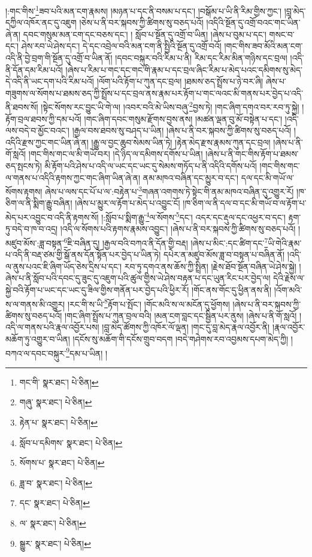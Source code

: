 །:གང་གིས་\footnote{གང་གི་  སྣར་ཐང་།  པེ་ཅིན། }ཟབ་པའི་མན་ངག་རྣམས། །མཉན་པ་དང་ནི་བསམ་པ་དང་། །བསྒོམ་པ་ཡི་ནི་རིམ་གྱིས་ཀྱང་། །བླ་མེད་དཀྱིལ་འཁོར་ནང་དུ་འཇུག །ཅེས་པ་ནི་བར་སྐབས་ཀྱི་ཚིགས་སུ་བཅད་པའོ། །འདིའི་སྔོན་དུ་འགྲོ་བའང་གང་ཡིན་ཞེ་ན། དབང་གསུམ་མན་ངག་དང་བཅས་དང་། །
སློབ་པ་སྔོན་དུ་འགྲོ་བ་ཡིན། །ཞེས་པ་བུམ་པ་དང་། གསང་བ་དང་། ཤེས་རབ་ཡེ་ཤེས་དང་། དེ་དང་འབྲེལ་བའི་མན་ངག་ནི་སྤྱིའི་སྔོན་དུ་འགྲོ་བའོ། །གང་གིས་ཟབ་མོའི་མན་ངག་འདི་ནི་བྱེ་བྲག་གི་སྔོན་དུ་འགྲོ་བ་ཡིན་ནོ། །དབང་བསྐུར་བའི་རིམ་པ་ནི། རིམ་དང་རིམ་མིན་གཉིས་དང་བྲལ། །འདི་ནི་དོན་དམ་རིམ་པའོ། །ཞེས་པ་རིམ་པ་གང་དང་གང་གི་རྣམ་པ་དང་བྲལ་ཞིང་རིམ་པ་མེད་པའང་དམིགས་སུ་མེད་དེ་འདི་ནི་ཡང་དག་པའི་རིམ་པའོ། །ལོག་པའི་རྟོག་པ་ཀུན་དང་བྲལ། །ཐམས་ཅད་སྤྲོས་པ་ཉེ་བར་ཞི། ཞེས་པ་གཟུགས་ལ་སོགས་པ་ཐམས་ཅད་ཀྱི་སྤྲོས་པ་དང་བྲལ་ནས་རྣམ་པར་རྟོག་པ་གང་ལའང་མི་གནས་པར་བྱེད་པ་འདི་ནི་ཐབས་སོ། །སྟེང་སོགས་རང་བྱུང་ཡི་གེ་ལ། །འབར་བའི་མེ་ཡིས་བཞུ་\footnote{གཞུ་  སྣར་ཐང་།  པེ་ཅིན། }བྱས་ཏེ། །གང་ཞིག་དགའ་བར་རབ་ཏུ་སྐྱེ། །རྟོག་བྲལ་ཐབས་ཀྱི་དམ་པའོ། །གང་ཞིག་དབང་གསུམ་རྫོགས་བྱས་ནས། །མཚན་ལྡན་བུ་མོ་བསྟེན་པ་དང་། །འདི་ལས་བདེ་བ་མྱོང་བའང་། །རྒྱལ་བས་ཐབས་སུ་བཤད་པ་ཡིན། །ཞེས་པ་ནི་བར་སྐབས་ཀྱི་ཚིགས་སུ་བཅད་པའོ། །འདིའི་རྫས་ཀྱང་གང་ཡིན་ཞེ་ན། །རྒྱུ་ལ་བྱང་ཆུབ་སེམས་ཡིན་ཏེ། །རྟེན་མེད་རྫས་རྣམས་ཀུན་དང་བྲལ། །ཞེས་པ་ནི་གོ་སླའོ། །གང་གིས་གང་ལ་མི་གཡོ་བར། །དེ་ཉིད་ལ་དམིགས་དགོས་པ་ཡིན། །ཞེས་པ་ནི་གང་གིས་རྟོག་པ་ཐམས་ཅད་སྤངས་ཏེ། མི་རྟོག་པའི་ཤེས་པ་འདི་ལ་ཡང་དང་ཡང་དུ་སེམས་གཏོད་པ་ནི་འདིའི་དགོས་པའོ། །གང་གིས་གང་ལ་གནས་པ་འདིའི་རྟགས་ཀྱང་གང་ཞིག་ཡིན་ཞེ་ན། ནམ་མཁའ་བཞིན་དང་མྱུར་བ་དང་། དལ་དང་མི་གཡོ་ལ་སོགས་རྟགས། ཞེས་པ་ལས་དང་པོ་པ་ལ་:བརྟེན་པ་\footnote{རྟེན་པ་  སྣར་ཐང་།  པེ་ཅིན། }གཞན་འགགས་ཏེ་སྟེང་གི་ནམ་མཁའ་བཞིན་དུ་འགྱུར་རོ། །ཁ་ཅིག་ལ་ནི་སྨིག་རྒྱུ་བཞིན། །ཞེས་པ་མྱུར་ལ་རྟོག་པ་མེད་པ་འབྱུང་ངོ། །ཁ་ཅིག་ལ་ནི་དལ་བ་དང་མི་གཡོ་བ་ལ་རྟོག་པ་མེད་པར་འབྱུང་བ་འདི་ནི་རྟགས་སོ། །:སློབ་པ་སྨིག་རྒྱུ་\footnote{སློབ་པ་དམིགས་  སྣར་ཐང་།  པེ་ཅིན། }ལ་སོགས་\footnote{སོགས་པ་  སྣར་ཐང་།  པེ་ཅིན། }དང་། འདར་དང་རྡུལ་དང་འཕྱར་བ་དང་། རྟག་ཏུ་བདེ་བ་ཁ་བ་འདྲ། །འདི་ལ་སོགས་པའི་རྟགས་རྣམས་འབྱུང་། །ཞེས་པ་ནི་བར་སྐབས་ཀྱི་ཚིགས་སུ་བཅད་པའོ། །མཛུབ་མོས་:ཟླ་བསྟན་\footnote{ཟླ་བ་  སྣར་ཐང་།  པེ་ཅིན། }ཇི་བཞིན་དུ། །རྒྱལ་བའི་བཀའ་ནི་དོན་གྱི་བརྡ། །ཞེས་པ་མིང་:དང་ཚིག་དང་\footnote{དང་  སྣར་ཐང་།  པེ་ཅིན། }ཡི་གེའི་རྣམ་པ་འདི་ནི་བརྡ་ཙམ་གྱི་སྒོ་ནས་དོན་སྟོན་པར་བྱེད་པ་ཡིན་ཏེ། དཔེར་ན་མཛུབ་མོས་ཟླ་བ་བསྟན་པ་བཞིན་ནོ། །འདི་ལ་ནུས་པའང་ཇི་ཞིག་ཡོད་ཅེས་དྲིས་པ་དང་། རབ་ཏུ་དགའ་ནས་ཆོས་ཀྱི་སྤྲིན། །རྗེས་ཐོབ་སྔོན་བཞིན་ཡེ་ཤེས་སྐྱེ། །ཞེས་པ་ནི་སློབ་པའི་དབང་དུ་ཟུང་དུ་འཇུག་པའི་ཚུལ་གྱིས་ཡེ་ཤེས་བརྟན་པ་དང་ཡུན་རིང་པར་བྱེད་ལ། དེའི་རྗེས་ལ་སྐྱེ་བའི་རྟོག་པ་ཡང་དང་ཡང་དུ་ཟིལ་གྱིས་གནོན་པར་བྱེད་པའི་ཕྱིར་རོ། །གོང་ནས་གོང་དུ་ཕྱིན་ནས་ནི། །འོག་མའི་ས་ལ་གནས་མི་འགྱུར། །རང་གི་ས་ཡི་\footnote{ལ་  སྣར་ཐང་།  པེ་ཅིན། }རྟོག་པ་སྤོང་། །གོང་མའི་ས་ལ་མངོན་དུ་ཕྱོགས། །ཞེས་པ་ནི་བར་སྐབས་ཀྱི་ཚིགས་སུ་བཅད་པའོ། །གང་ཞིག་སྤྲོས་པ་ཀུན་བྲལ་བའི། །མན་ངག་བླང་དང་སྦྱིན་པར་ནུས། །ཞེས་པ་ནི་གོ་སླའོ། །འདི་ལ་གནས་པའི་རྣལ་འབྱོར་པས། །བླ་མེད་ཚོགས་ཀྱི་འཁོར་ལོ་ལྡན། །གང་དུ་བླ་མེད་རྣལ་འབྱོར་ནི། །རྣལ་འབྱོར་མཆོག་ཏུ་འགྱུར་བ་ཡིན། །དངོས་སུ་མཆོག་གི་དངོས་གྲུབ་བདག །བདེ་གཤེགས་རབ་འབྱམས་དཔག་མེད་ཀྱི། །བཀའ་ལ་དབང་བསྐུར་\footnote{སྒྱུར་  སྣར་ཐང་།  པེ་ཅིན། }དམ་པ་ཡིན། །
